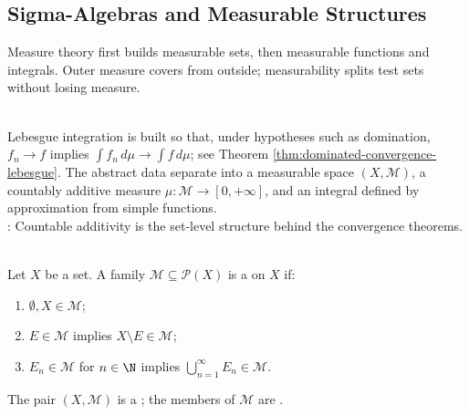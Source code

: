 \subsection{Sigma-Algebras and Measurable Structures}

%

Measure theory first builds measurable sets, then measurable functions and integrals. Outer measure covers from outside; measurability splits test sets without losing measure.

\begin{perspective} \label{per:measure-integration-roadmap} \\
Lebesgue integration is built so that, under hypotheses such as domination, $f_n\to f$ implies $\int f_n\,d\mu\to\int f\,d\mu$; see Theorem \ref{thm:dominated-convergence-lebesgue}. The abstract data separate into a measurable space $(X,\mathcal{M})$, a countably additive measure $\mu:\mathcal{M}\to[0,+\infty]$, and an integral defined by approximation from simple functions.\\
: Countable additivity is the set-level structure behind the convergence theorems.
\end{perspective}

\begin{definition} \label{def:sigma-algebra-and-measurable-space} \\
Let $X$ be a set. A family $\mathcal{M}\subseteq\mathcal{P}(X)$ is a  on $X$ if:
\begin{enumerate}[label=(\roman*)]
\setlength{\itemsep}{0pt}
\item $\emptyset,X\in\mathcal{M}$;
\item $E\in\mathcal{M}$ implies $X\setminus E\in\mathcal{M}$;
\item $E_n\in\mathcal{M}$ for $n\in\N$ implies $\bigcup\limits_{n=1}^{\infty}E_n\in\mathcal{M}$.
\end{enumerate}
The pair $(X,\mathcal{M})$ is a ; the members of $\mathcal{M}$ are .
\end{definition}

